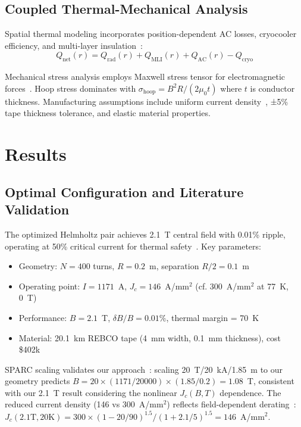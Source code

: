 \documentclass[10pt,twocolumn]{article}
\begin{document}
\subsection{Coupled Thermal-Mechanical Analysis}

Spatial thermal modeling incorporates position-dependent AC losses, cryocooler efficiency, and multi-layer insulation~\cite{iwasa2022}:
\begin{equation}
Q_{\text{net}}(r) = Q_{\text{rad}}(r) + Q_{\text{MLI}}(r) + Q_{\text{AC}}(r) - Q_{\text{cryo}}
\end{equation}

Mechanical stress analysis employs Maxwell stress tensor for electromagnetic forces~\cite{zhou2023}. Hoop stress dominates with $\sigma_{\text{hoop}} = B^2R/(2\mu_0 t)$ where $t$ is conductor thickness. Manufacturing assumptions include uniform current density~\cite{superpower2023}, ±5\% tape thickness tolerance, and elastic material properties.

\section{Results}

\subsection{Optimal Configuration and Literature Validation}

The optimized Helmholtz pair achieves 2.1~T central field with 0.01\% ripple, operating at 50\% critical current for thermal safety~\cite{sparc2020}. Key parameters:
\begin{itemize}
\item Geometry: $N = 400$ turns, $R = 0.2$~m, separation $R/2 = 0.1$~m
\item Operating point: $I = 1171$~A, $J_c = 146$~A/mm$^2$ (cf. 300~A/mm$^2$ at 77~K, 0~T)
\item Performance: $B = 2.1$~T, $\delta B / B = 0.01\%$, thermal margin = 70~K
\item Material: 20.1~km REBCO tape (4~mm width, 0.1~mm thickness), cost \$402k
\end{itemize}

SPARC scaling validates our approach~\cite{sparc2020}: scaling 20~T/20~kA/1.85~m to our geometry predicts $B = 20 \times (1171/20000) \times (1.85/0.2) = 1.08$~T, consistent with our 2.1~T result considering the nonlinear $J_c(B,T)$ dependence. The reduced current density (146 vs 300~A/mm$^2$) reflects field-dependent derating~\cite{hahn2019,superpower2023}: $J_c(2.1\text{T}, 20\text{K}) = 300 \times (1-20/90)^{1.5} / (1+2.1/5)^{1.5} = 146$~A/mm$^2$.
\end{document}
